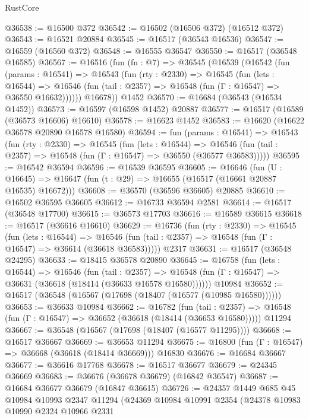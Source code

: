 \begin{lexlean}{RustCore}
\begin{coremodule}
@36538 := @16500 @372
@36542 := @16502 (@16506 @372) (@16512 @372)
@36543 := @16521 @20884
@36545 := @16517 (@36543 @16536)
@36547 := @16559 (@16560 @372)
@36548 := @16555 @36547
@36550 := @16517 (@36548 @16585)
@36567 := @16516
    (fun (fn : @7) =>
    @36545
      (@16539
        (@16542
          (fun (params : @16541) =>
          @16543
            (fun (rty : @2330) =>
            @16545
              (fun (lets : @16544) =>
              @16546 (fun (tail : @2357) => @16548 (fun (Γ : @16547) => @36550 @16632))))))
        @16678))
    @1452
@36570 := @16684 (@36543 (@16534 @1452))
@36573 := @16597 (@16598 @1452) @20887
@36577 := @16517 (@16589 (@36573 @16606) @16610)
@36578 := @16623 @1452
@36583 := @16620 (@16622 @36578 @20890 @16578 @16580)
@36594 := fun (params : @16541) =>
  @16543
    (fun (rty : @2330) =>
    @16545
      (fun (lets : @16544) =>
      @16546 (fun (tail : @2357) => @16548 (fun (Γ : @16547) => @36550 (@36577 @36583)))))
@36595 := @16542 @36594
@36596 := @16539 @36595
@36605 := @16646
    (fun (U : @16645) => @16647 (fun (t : @29) => @16655 (@16517 (@16661 @20887 @16535) @16672)))
@36608 := @36570 (@36596 @36605) @20885
@36610 := @16502 @36595 @36605
@36612 := @16733 @36594 @2581
@36614 := @16517 (@36548 @17700)
@36615 := @36573 @17703
@36616 := @16589 @36615
@36618 := @16517 (@36616 @16610)
@36629 := @16736
    (fun (rty : @2330) =>
    @16545
      (fun (lets : @16544) =>
      @16546 (fun (tail : @2357) => @16548 (fun (Γ : @16547) => @36614 (@36618 @36583)))))
    @2317
@36631 := @16517 (@36548 @24295)
@36633 := @18415 @36578 @20890
@36645 := @16758
    (fun (lets : @16544) =>
    @16546
      (fun (tail : @2357) =>
      @16548 (fun (Γ : @16547) => @36631 (@36618 (@18414 (@36633 @16578 @16580))))))
    @10984
@36652 := @16517 (@36548 (@16567 (@17698 (@18407 (@16577 (@10985 @16580))))))
@36653 := @36633 @10984
@36662 := @16782
    (fun (tail : @2357) => @16548 (fun (Γ : @16547) => @36652 (@36618 (@18414 (@36653 @16580)))))
    @11294
@36667 := @36548 (@16567 (@17698 (@18407 (@16577 @11295))))
@36668 := @16517 @36667
@36669 := @36653 @11294
@36675 := @16800 (fun (Γ : @16547) => @36668 (@36618 (@18414 @36669))) @16830
@36676 := @16684 @36667
@36677 := @36616 @17768
@36678 := @16517 @36677
@36679 := @24345 @36669
@36683 := @36676 (@36678 @36679) (@16842 @36547)
@36687 := @16684 @36677 @36679 (@16847 @36615)
@36726 := @24357
    @1449
    @685
    @45
    @10984
    @10993
    @2347
    @11294
    (@24369
      @10984
      @10991
      @2354
      (@24378
        @10983
        @10990
        @2324
        @10966
        @2331

\end{coremodule}
\end{lexlean}
